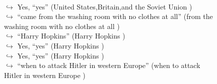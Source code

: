 \documentclass[11pt,a4paper, onecolumn]{article}
\begin{document}
\begin{figure}[t]
\begin{tcolorbox}[boxsep=0pt,left=5pt,right=0pt,top=2pt,colback = yellow!5]
\begin{dialogue}
\\
\colorbox{pink!25}{$\hookrightarrow$}
\colorbox{red!25}{Yes,}
{ ``yes'' (United States,Britain,and the Soviet Union ) }
\\
\colorbox{pink!25}{$\hookrightarrow$}
{ ``came from the washing room with no clothes at all'' (from the washing room with no clothes at all ) }
\\
\colorbox{pink!25}{$\hookrightarrow$}
{ ``Harry Hopkins'' (Harry Hopkins ) }
\\
\colorbox{pink!25}{$\hookrightarrow$}
\colorbox{red!25}{Yes,}
{ ``yes'' (Harry Hopkins ) }
\\
\colorbox{pink!25}{$\hookrightarrow$}
\colorbox{red!25}{Yes,}
{ ``yes'' (Harry Hopkins ) }
\\
\colorbox{pink!25}{$\hookrightarrow$}
{ ``when to attack Hitler in western Europe'' (when to attack Hitler in western Europe ) }
 \end{dialogue}\end{tcolorbox}\end{figure}
\end{document}
